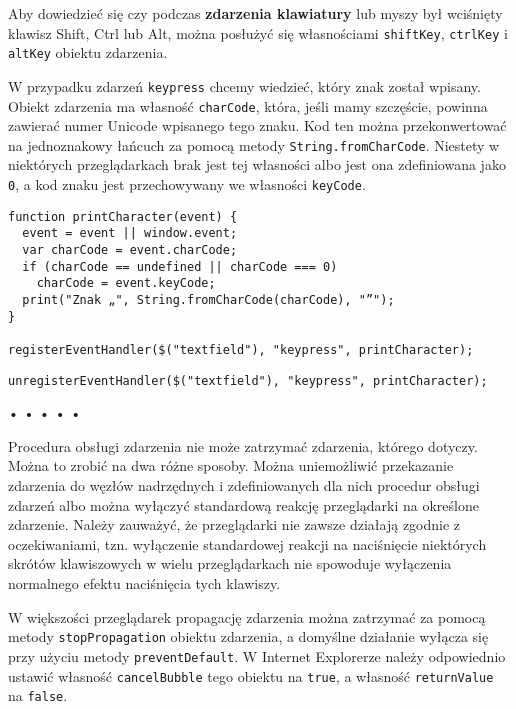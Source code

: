   
Aby dowiedzieć się czy podczas \textbf{zdarzenia klawiatury} lub myszy był wciśnięty klawisz Shift, Ctrl lub Alt, można posłużyć się własnościami \texttt{shiftKey}, \texttt{ctrlKey} i \texttt{altKey} obiektu zdarzenia.

  
W przypadku zdarzeń \texttt{keypress} chcemy wiedzieć, który znak został wpisany. Obiekt zdarzenia ma własność \texttt{charCode}, która, jeśli mamy szczęście, powinna zawierać numer Unicode wpisanego tego znaku. Kod ten można przekonwertować na jednoznakowy łańcuch za pomocą metody \texttt{String.fromCharCode}. Niestety w niektórych przeglądarkach brak jest tej własności albo jest ona zdefiniowana jako \texttt{0}, a kod znaku jest przechowywany we własności \texttt{keyCode}.

  
\begin{verbatim} 
function printCharacter(event) {
  event = event || window.event;
  var charCode = event.charCode;
  if (charCode == undefined || charCode === 0)
    charCode = event.keyCode;
  print("Znak „", String.fromCharCode(charCode), "”");
}

registerEventHandler($("textfield"), "keypress", printCharacter);
 \end{verbatim}
  
\begin{verbatim} 
unregisterEventHandler($("textfield"), "keypress", printCharacter);
 \end{verbatim}


\begin{center}
• • • • •
\end{center}

  
Procedura obsługi zdarzenia nie może zatrzymać zdarzenia, którego dotyczy. Można to zrobić na dwa różne sposoby. Można uniemożliwić przekazanie zdarzenia do węzłów nadrzędnych i zdefiniowanych dla nich procedur obsługi zdarzeń albo można wyłączyć standardową reakcję przeglądarki na określone zdarzenie. Należy zauważyć, że przeglądarki nie zawsze działają zgodnie z oczekiwaniami, tzn. wyłączenie standardowej reakcji na naciśnięcie niektórych skrótów klawiszowych w wielu przeglądarkach nie spowoduje wyłączenia normalnego efektu naciśnięcia tych klawiszy.

  
W większości przeglądarek propagację zdarzenia można zatrzymać za pomocą metody \texttt{stopPropagation} obiektu zdarzenia, a domyślne działanie wyłącza się przy użyciu metody \texttt{preventDefault}. W Internet Explorerze należy odpowiednio ustawić własność \texttt{cancelBubble} tego obiektu na \texttt{true}, a własność \texttt{returnValue} na \texttt{false}.


